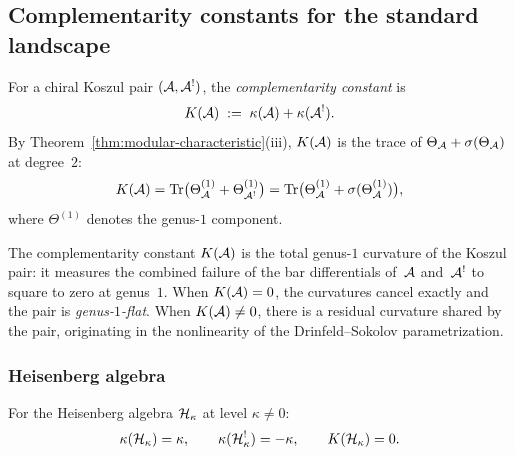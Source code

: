 %
%

\subsection{Complementarity constants for the standard landscape}
\label{subsec:thqg-IV-complementarity-constant}

\begin{definition}
\label{def:thqg-IV-complementarity-constant}
For a chiral Koszul pair $(\mathcal{A}, \mathcal{A}^!)$, the
\emph{complementarity constant} is
\begin{equation}\label{eq:thqg-IV-K-def}
K(\mathcal{A})
\;:=\;
\kappa(\mathcal{A}) + \kappa(\mathcal{A}^!).
\end{equation}
By Theorem~\ref{thm:modular-characteristic}\textup{(}iii\textup{)},
$K(\mathcal{A})$ is the trace of
$\Theta_{\mathcal{A}} + \sigma(\Theta_{\mathcal{A}})$ at degree~$2$:
\[
K(\mathcal{A})
= \operatorname{Tr}\bigl(\Theta_{\mathcal{A}}^{(1)} + \Theta_{\mathcal{A}^!}^{(1)}\bigr)
= \operatorname{Tr}\bigl(\Theta_{\mathcal{A}}^{(1)} + \sigma(\Theta_{\mathcal{A}}^{(1)})\bigr),
\]
where $\Theta^{(1)}$ denotes the genus-$1$ component.
\end{definition}

\begin{remark}
\label{rem:thqg-IV-K-physical}
The complementarity constant $K(\mathcal{A})$ is the total genus-$1$
curvature of the Koszul pair: it measures the combined failure of the
bar differentials of~$\mathcal{A}$ and~$\mathcal{A}^!$ to square to zero at
genus~$1$. When $K(\mathcal{A}) = 0$, the curvatures cancel exactly and the
pair is \emph{genus-$1$-flat}. When $K(\mathcal{A}) \neq 0$, there is a
residual curvature shared by the pair, originating in the nonlinearity
of the Drinfeld--Sokolov parametrization.
\end{remark}

\subsubsection{Heisenberg algebra}

\begin{proposition}
\label{prop:thqg-IV-heisenberg-K}
For the Heisenberg algebra $\mathcal{H}_\kappa$ at level $\kappa \neq 0$:
\begin{equation}\label{eq:thqg-IV-heisenberg-K}
\kappa(\mathcal{H}_\kappa) = \kappa,
\qquad
\kappa(\mathcal{H}_\kappa^!) = -\kappa,
\qquad
K(\mathcal{H}_\kappa) = 0.
\end{equation}
\end{proposition}

